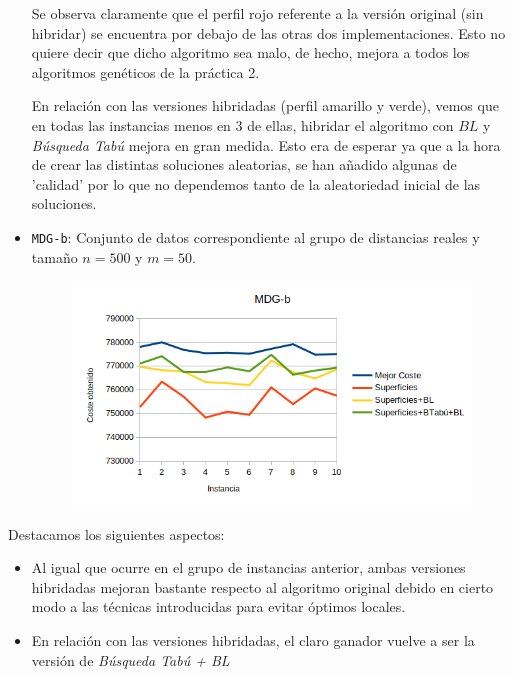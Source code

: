 \begin{itemize}
	Se observa claramente que el perfil rojo referente a la versión original (sin hibridar) se encuentra por debajo de las otras dos implementaciones. Esto no quiere decir que dicho algoritmo sea malo, de hecho, mejora a todos los algoritmos genéticos de la práctica 2. 
	
	En relación con las versiones hibridadas (perfil amarillo y verde), vemos que en todas las instancias menos en 3 de ellas, hibridar el algoritmo con $BL$ y \textit{Búsqueda Tabú} mejora en gran medida. Esto era de esperar ya que a la hora de crear las distintas soluciones aleatorias, se han añadido algunas de 'calidad' por lo que no dependemos tanto de la aleatoriedad inicial de las soluciones.
	
	

 	\item \texttt{MDG-b}: Conjunto de datos correspondiente al grupo de distancias reales y tamaño $n=500$ y $m=50$. 
	\begin{figure}[H]
	\centering
	\includegraphics[scale=0.55]{img/b.png}
\end{figure}


\end{itemize}

	Destacamos los siguientes aspectos: 
	\begin{itemize}
		\item Al igual que ocurre en el grupo de instancias anterior, ambas versiones hibridadas mejoran bastante respecto al algoritmo original debido en cierto modo a las técnicas introducidas para evitar óptimos locales. 
		
		\item En relación con las versiones hibridadas, el claro ganador vuelve a ser la versión de \textit{Búsqueda Tabú + BL}
	\end{itemize}

